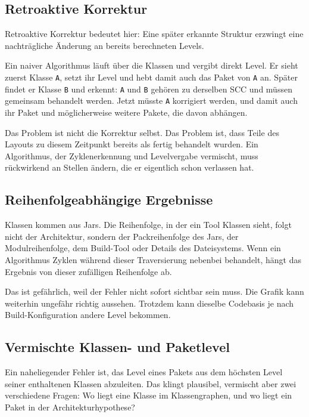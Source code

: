 \documentclass[a4paper,11pt]{article}
\begin{document}
\subsection{Retroaktive Korrektur}

Retroaktive Korrektur bedeutet hier: Eine sp\"ater erkannte Struktur erzwingt
eine nachtr\"agliche \"Anderung an bereits berechneten Levels.

Ein naiver Algorithmus l\"auft \"uber die Klassen und vergibt direkt Level. Er
sieht zuerst Klasse \texttt{A}, setzt ihr Level und hebt damit auch das Paket
von \texttt{A} an. Sp\"ater findet er Klasse \texttt{B} und erkennt: \texttt{A}
und \texttt{B} geh\"oren zu derselben SCC und m\"ussen gemeinsam behandelt
werden. Jetzt m\"usste \texttt{A} korrigiert werden, und damit auch ihr Paket
und m\"oglicherweise weitere Pakete, die davon abh\"angen.

Das Problem ist nicht die Korrektur selbst. Das Problem ist, dass Teile des
Layouts zu diesem Zeitpunkt bereits als fertig behandelt wurden. Ein
Algorithmus, der Zyklenerkennung und Levelvergabe vermischt, muss r\"uckwirkend
an Stellen \"andern, die er eigentlich schon verlassen hat.

\subsection{Reihenfolgeabh\"angige Ergebnisse}

Klassen kommen aus Jars. Die Reihenfolge, in der ein Tool Klassen sieht, folgt
nicht der Architektur, sondern der Packreihenfolge des Jars, der Modulreihenfolge,
dem Build-Tool oder Details des Dateisystems. Wenn ein Algorithmus Zyklen
w\"ahrend dieser Traversierung nebenbei behandelt, h\"angt das Ergebnis von
dieser zuf\"alligen Reihenfolge ab.

Das ist gef\"ahrlich, weil der Fehler nicht sofort sichtbar sein muss. Die
Grafik kann weiterhin ungef\"ahr richtig aussehen. Trotzdem kann dieselbe
Codebasis je nach Build-Konfiguration andere Level bekommen.

\subsection{Vermischte Klassen- und Paketlevel}

Ein naheliegender Fehler ist, das Level eines Pakets aus dem h\"ochsten Level
seiner enthaltenen Klassen abzuleiten. Das klingt plausibel, vermischt aber
zwei verschiedene Fragen: Wo liegt eine Klasse im Klassengraphen, und wo liegt
ein Paket in der Architekturhypothese?
\end{document}
